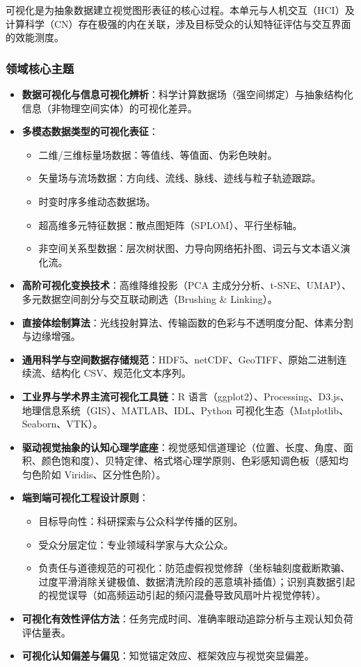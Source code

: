 可视化是为抽象数据建立视觉图形表征的核心过程。本单元与人机交互（HCI）及计算科学（CN）存在极强的内在关联，涉及目标受众的认知特征评估与交互界面的效能测度。

\subsubsection{领域核心主题}
\begin{itemize}
    \item \textbf{数据可视化与信息可视化辨析}：科学计算数据场（强空间绑定）与抽象结构化信息（非物理空间实体）的可视化差异。
    \item \textbf{多模态数据类型的可视化表征}：
    \begin{itemize}
        \item 二维/三维标量场数据：等值线、等值面、伪彩色映射。
        \item 矢量场与流场数据：方向线、流线、脉线、迹线与粒子轨迹跟踪。
        \item 时变时序多维动态数据场。
        \item 超高维多元特征数据：散点图矩阵（SPLOM）、平行坐标轴。
        \item 非空间关系型数据：层次树状图、力导向网络拓扑图、词云与文本语义演化流。
    \end{itemize}
    \item \textbf{高阶可视化变换技术}：高维降维投影（PCA 主成分分析、t-SNE、UMAP）、多元数据空间剖分与交互联动刷选（Brushing \& Linking）。
    \item \textbf{直接体绘制算法}：光线投射算法、传输函数的色彩与不透明度分配、体素分割与边缘增强。
    \item \textbf{通用科学与空间数据存储规范}：HDF5、netCDF、GeoTIFF、原始二进制连续流、结构化 CSV、规范化文本序列。
    \item \textbf{工业界与学术界主流可视化工具链}：R 语言（ggplot2）、Processing、D3.js、地理信息系统（GIS）、MATLAB、IDL、Python 可视化生态（Matplotlib、Seaborn、VTK）。
    \item \textbf{驱动视觉抽象的认知心理学底座}：视觉感知信道理论（位置、长度、角度、面积、颜色饱和度）、贝特定律、格式塔心理学原则、色彩感知调色板（感知均匀色阶如 Viridis、区分性色阶）。
    \item \textbf{端到端可视化工程设计原则}：
    \begin{itemize}
        \item 目标导向性：科研探索与公众科学传播的区别。
        \item 受众分层定位：专业领域科学家与大众公众。
        \item 负责任与道德规范的可视化：防范虚假视觉修辞（坐标轴刻度截断欺骗、过度平滑消除关键极值、数据清洗阶段的恶意填补插值）；识别真数据引起的视觉误导（如高频运动引起的频闪混叠导致风扇叶片视觉停转）。
    \end{itemize}
    \item \textbf{可视化有效性评估方法}：任务完成时间、准确率眼动追踪分析与主观认知负荷评估量表。
    \item \textbf{可视化认知偏差与偏见}：知觉锚定效应、框架效应与视觉突显偏差。
\end{itemize}

